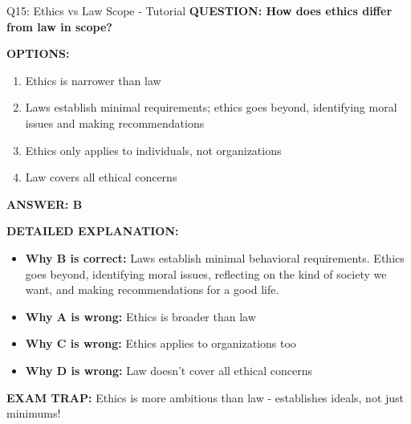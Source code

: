 \documentclass[8pt]{beamer}
\begin{document}
	\begin{frame}{Q15: Ethics vs Law Scope - Tutorial}
		\fontsize{6.5}{7.5}\selectfont
		\textbf{QUESTION: How does ethics differ from law in scope?}
		
		\vspace{0.1cm}
		\textbf{OPTIONS:}
		\begin{enumerate}
			\item Ethics is narrower than law
			\item Laws establish minimal requirements; ethics goes beyond, identifying moral issues and making recommendations
			\item Ethics only applies to individuals, not organizations
			\item Law covers all ethical concerns
		\end{enumerate}
		
		\vspace{0.1cm}
		\textcolor{myblue}{\textbf{ANSWER: B}}
		
		\vspace{0.1cm}
		\textbf{DETAILED EXPLANATION:}
		\begin{itemize}
			\item \textbf{Why B is correct:} Laws establish minimal behavioral requirements. Ethics goes beyond, identifying moral issues, reflecting on the kind of society we want, and making recommendations for a good life.
			\item \textbf{Why A is wrong:} Ethics is broader than law
			\item \textbf{Why C is wrong:} Ethics applies to organizations too
			\item \textbf{Why D is wrong:} Law doesn't cover all ethical concerns
		\end{itemize}
		
		\textcolor{myred}{\textbf{EXAM TRAP:}} Ethics is \textcolor{myblue}{more ambitious than law} - establishes ideals, not just minimums!
	\end{frame}
	
	
\end{document}
